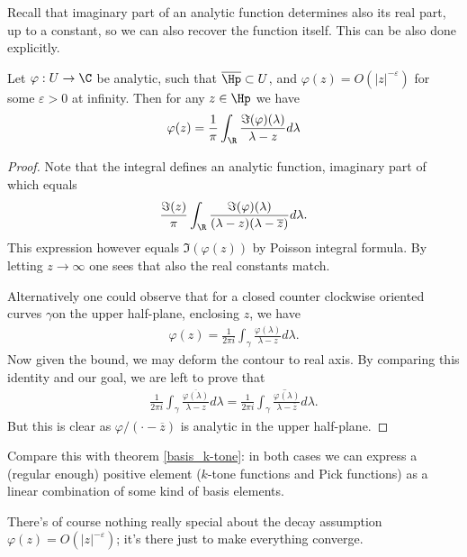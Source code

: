 Recall that imaginary part of an analytic function determines also its real part, up to a constant, so we can also recover the function itself. This can be also done explicitly.

\begin{lause}
	Let $\varphi : U \to \C$ be analytic, such that $\overline{\Hp} \subset U$, and $\varphi(z) = O(|z|^{-\varepsilon})$ for some $\varepsilon > 0$ at infinity. Then for any $z \in \Hp$ we have
	\begin{align*}
		\varphi(z) = \frac{1}{\pi}\int_{\R} \frac{\Im(\varphi)(\lambda)}{\lambda - z} d \lambda
	\end{align*}
\end{lause}
\begin{proof}
	Note that the integral defines an analytic function, imaginary part of which equals
	\begin{align*}
		\frac{\Im(z)}{\pi}\int_{\R} \frac{\Im(\varphi)(\lambda)}{(\lambda - z)(\lambda - \overline{z})} d \lambda.
	\end{align*}
	This expression however equals $\Im(\varphi(z))$ by Poisson integral formula. By letting $z \to \infty$ one sees that also the real constants match.

	Alternatively one could observe that for a closed counter clockwise oriented curves $\gamma $on the upper half-plane, enclosing $z$, we have
	\begin{align*}
		\varphi(z) = \frac{1}{2\pi i}\int_{\gamma} \frac{\varphi(\lambda)}{\lambda - z} d \lambda.
	\end{align*}
	Now given the bound, we may deform the contour to real axis. By comparing this identity and our goal, we are left to prove that
	\begin{align*}
		\frac{1}{2\pi i}\int_{\gamma} \frac{\overline{\varphi(\lambda)}}{\lambda - z} d \lambda = \frac{1}{2\pi i} \overline{\int_{\gamma} \frac{\varphi(\lambda)}{\lambda - \overline{z}} d \lambda}.
	\end{align*}
	But this is clear as $\varphi/(\cdot - \overline{z})$ is analytic in the upper half-plane.
\end{proof}

Compare this with theorem \ref{basis_k-tone}: in both cases we can express a (regular enough) positive element ($k$-tone functions and Pick functions) as a linear combination of some kind of basis elements.

There's of course nothing really special about the decay assumption $\varphi(z) = O(|z|^{-\varepsilon})$; it's there just to make everything converge.

